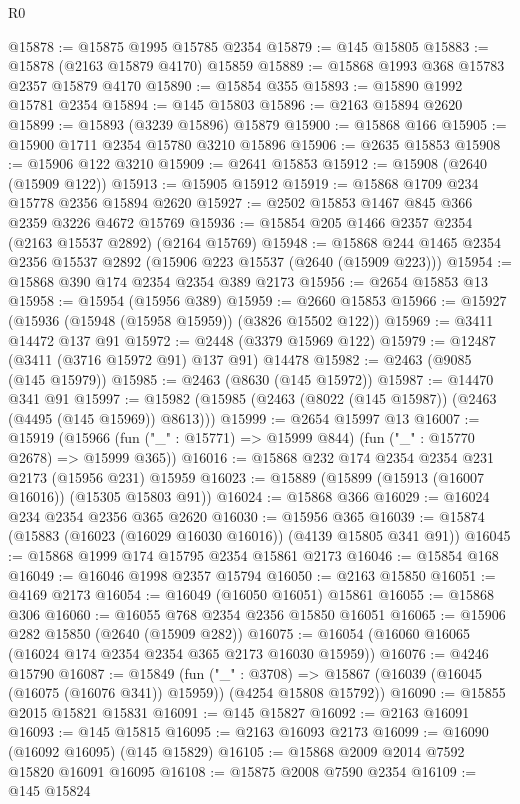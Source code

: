 \begin{lexlean}{R0}
\begin{coremodule}
@15878 := @15875 @1995 @15785 @2354
@15879 := @145 @15805
@15883 := @15878 (@2163 @15879 @4170) @15859
@15889 := @15868 @1993 @368 @15783 @2357 @15879 @4170
@15890 := @15854 @355
@15893 := @15890 @1992 @15781 @2354
@15894 := @145 @15803
@15896 := @2163 @15894 @2620
@15899 := @15893 (@3239 @15896) @15879
@15900 := @15868 @166
@15905 := @15900 @1711 @2354 @15780 @3210 @15896
@15906 := @2635 @15853
@15908 := @15906 @122 @3210
@15909 := @2641 @15853
@15912 := @15908 (@2640 (@15909 @122))
@15913 := @15905 @15912
@15919 := @15868 @1709 @234 @15778 @2356 @15894 @2620
@15927 := @2502 @15853 @1467 @845 @366 @2359 @3226 @4672 @15769
@15936 := @15854 @205 @1466 @2357 @2354 (@2163 @15537 @2892) (@2164 @15769)
@15948 := @15868 @244 @1465 @2354 @2356 @15537 @2892 (@15906 @223 @15537 (@2640 (@15909 @223)))
@15954 := @15868 @390 @174 @2354 @2354 @389 @2173
@15956 := @2654 @15853 @13
@15958 := @15954 (@15956 @389)
@15959 := @2660 @15853
@15966 := @15927 (@15936 (@15948 (@15958 @15959)) (@3826 @15502 @122))
@15969 := @3411 @14472 @137 @91
@15972 := @2448 (@3379 @15969 @122)
@15979 := @12487 (@3411 (@3716 @15972 @91) @137 @91) @14478
@15982 := @2463 (@9085 (@145 @15979))
@15985 := @2463 (@8630 (@145 @15972))
@15987 := @14470 @341 @91
@15997 := @15982 (@15985 (@2463 (@8022 (@145 @15987)) (@2463 (@4495 (@145 @15969)) @8613)))
@15999 := @2654 @15997 @13
@16007 := @15919
    (@15966 (fun ("_" : @15771) => @15999 @844) (fun ("_" : @15770 @2678) => @15999 @365))
@16016 := @15868 @232 @174 @2354 @2354 @231 @2173 (@15956 @231) @15959
@16023 := @15889 (@15899 (@15913 (@16007 @16016)) (@15305 @15803 @91))
@16024 := @15868 @366
@16029 := @16024 @234 @2354 @2356 @365 @2620
@16030 := @15956 @365
@16039 := @15874 (@15883 (@16023 (@16029 @16030 @16016)) (@4139 @15805 @341 @91))
@16045 := @15868 @1999 @174 @15795 @2354 @15861 @2173
@16046 := @15854 @168
@16049 := @16046 @1998 @2357 @15794
@16050 := @2163 @15850
@16051 := @4169 @2173
@16054 := @16049 (@16050 @16051) @15861
@16055 := @15868 @306
@16060 := @16055 @768 @2354 @2356 @15850 @16051
@16065 := @15906 @282 @15850 (@2640 (@15909 @282))
@16075 := @16054 (@16060 @16065 (@16024 @174 @2354 @2354 @365 @2173 @16030 @15959))
@16076 := @4246 @15790
@16087 := @15849
    (fun ("_" : @3708) =>
    @15867 (@16039 (@16045 (@16075 (@16076 @341)) @15959)) (@4254 @15808 @15792))
@16090 := @15855 @2015 @15821 @15831
@16091 := @145 @15827
@16092 := @2163 @16091
@16093 := @145 @15815
@16095 := @2163 @16093 @2173
@16099 := @16090 (@16092 @16095) (@145 @15829)
@16105 := @15868 @2009 @2014 @7592 @15820 @16091 @16095
@16108 := @15875 @2008 @7590 @2354
@16109 := @145 @15824

\end{coremodule}
\end{lexlean}
